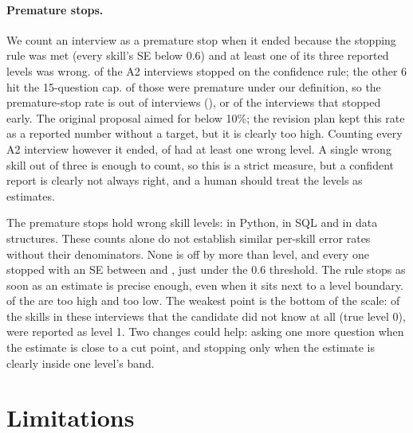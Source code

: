\documentclass[11pt,a4paper]{article}
\begin{document}
\paragraph{Premature stops.} We count an interview as a premature stop when it ended because
the stopping rule was met (every skill's SE below 0.6) and at least one of its three reported levels
was wrong. \stoppedConfident{} of the \nCandidates{} A2 interviews stopped on the confidence rule;
the other 6 hit the 15-question cap. \confidentWrong{} of those \stoppedConfident{} were premature
under our definition, so the premature-stop rate is \confidentWrong{} out of \nCandidates{} interviews
(\prematureOurs{}), or \confidentWrongShare{} of the interviews that stopped early. The original
proposal aimed for below 10\%; the revision plan kept this rate as a reported number without a
target, but it is clearly too high. Counting every A2 interview however it ended,
\anyWrongOurs{} of \nCandidates{} had at least one wrong level. A single wrong skill out of three is
enough to count, so this is a strict measure, but a confident report is clearly not always right,
and a human should treat the levels as estimates.

The \confidentWrong{} premature stops hold \premMisses{} wrong skill levels: \premPy{} in Python,
\premSql{} in SQL and \premDs{} in data structures. These counts alone do not establish similar
per-skill error rates without their denominators. None is off by more than
\premMaxGap{} level, and every one stopped with an SE between \premSeLow{} and \premSeHigh{}, just
under the 0.6 threshold. The rule stops as soon as an estimate is precise enough, even when it sits
next to a level boundary. \premOver{} of the \premMisses{} are too high and \premUnder{} too low.
The weakest point is the bottom of the scale: of the \premZeroSkills{} skills in these interviews
that the candidate did not know at all (true level 0), \premZeroMissed{} were reported as level 1.
Two changes could help: asking one more question when the estimate is close to a cut point, and
stopping only when the estimate is clearly inside one level's band.

\section{Limitations}
\end{document}
